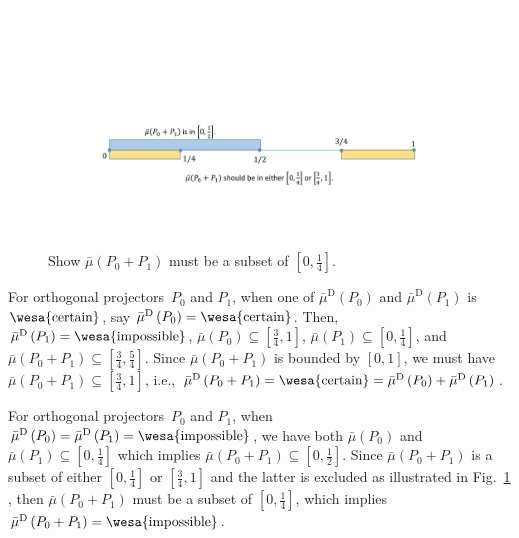 \documentclass[english,reprint, aps, prl,superscriptaddress, showpacs,
showkeys, longbibliography, amsmath, amssymb, floatfix]{revtex4-1}
\theoremstyle{plain}
\theoremstyle{definition}
\newcommand{\imposs}{{\text{\wesa{impossible}}}}
\newcommand{\necess}{{\text{\wesa{certain}}}}
\begin{document}
\begin{figure}
\includegraphics[bb=50bp 100bp 900bp 300bp,clip,scale=0.5]{prop_prop_letter_ajhs_referee_response_pptx}\caption{\label{fig:Show-subset}Show $\bar{\mu}\left(P_{0}+P_{1}\right)$
must be a subset of $\left[0,\frac{1}{4}\right]$.}
\end{figure}
For orthogonal projectors~$P_{0}$ and $P_{1}$, when one of $\bar{\mu}^{\textrm{D}}\left(P_{0}\right)$
and $\bar{\mu}^{\textrm{D}}\left(P_{1}\right)$ is $\necess$, say
$\bar{\mu}^{\textrm{D}}\left(P_{0}\right)=\necess$. Then, $\bar{\mu}^{\textrm{D}}\left(P_{1}\right)=\imposs$,
$\bar{\mu}\left(P_{0}\right)\subseteq\left[\frac{3}{4},1\right]$,
$\bar{\mu}\left(P_{1}\right)\subseteq\left[0,\frac{1}{4}\right]$,
and $\bar{\mu}\left(P_{0}+P_{1}\right)\subseteq\left[\frac{3}{4},\frac{5}{4}\right]$.
Since $\bar{\mu}\left(P_{0}+P_{1}\right)$ is bounded by $\left[0,1\right]$,
we must have $\bar{\mu}\left(P_{0}+P_{1}\right)\subseteq\left[\frac{3}{4},1\right]$,
i.e., $\bar{\mu}^{\textrm{D}}\left(P_{0}+P_{1}\right)=\necess=\bar{\mu}^{\textrm{D}}\left(P_{0}\right)+\bar{\mu}^{\textrm{D}}\left(P_{1}\right)$.

For orthogonal projectors~$P_{0}$ and $P_{1}$, when $\bar{\mu}^{\textrm{D}}\left(P_{0}\right)=\bar{\mu}^{\textrm{D}}\left(P_{1}\right)=\imposs$,
we have both $\bar{\mu}\left(P_{0}\right)$ and $\bar{\mu}\left(P_{1}\right)\subseteq\left[0,\frac{1}{4}\right]$
which implies $\bar{\mu}\left(P_{0}+P_{1}\right)\subseteq\left[0,\frac{1}{2}\right]$.
Since $\bar{\mu}\left(P_{0}+P_{1}\right)$ is a subset of either $\left[0,\frac{1}{4}\right]$
or $\left[\tfrac{3}{4},1\right]$ and the latter is excluded as illustrated
in Fig.~\ref{fig:Show-subset} , then $\bar{\mu}\left(P_{0}+P_{1}\right)$
must be a subset of $\left[0,\frac{1}{4}\right]$, which implies $\bar{\mu}^{\textrm{D}}\left(P_{0}+P_{1}\right)=\imposs$.


\end{document}

